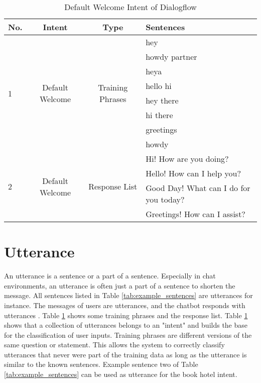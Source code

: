 \begin{table}[H]
    \centering
    \begin{tabular}{ l | c | c | l }
  No. & Intent & Type & Sentences \\ \hline \hline
  \multirow{8}{*}{1}
  & \multirow{8}{*}{Default Welcome} & \multirow{8}{*}{Training Phrases} & hey \\
      & & & howdy partner\\
      & & & heya\\ 
      & & & hello hi\\ 
      & & & hey there\\ 
      & & & hi there\\ 
      & & & greetings\\ 
      & & & howdy \\ \hline
  \multirow{4}{*}{2}
  & \multirow{4}{*}{Default Welcome} & \multirow{4}{*}{Response List} & Hi! How are you doing? \\
      & & & Hello! How can I help you?\\
      & & & Good Day! What can I do for you today?\\ 
      & & & Greetings! How can I assist?\\ \hline
\end{tabular}
    \caption{Default Welcome Intent of Dialogflow} \label{tab:defaultwelcomedialogflow}
\end{table} \noindent



\section{Utterance} \label{sec:utterance}
An utterance is a sentence or a part of a sentence.
Especially in chat environments, an utterance is often just a part of a sentence to shorten the message. 
All sentences listed in Table \ref{tab:example_sentences} are utterances for instance.
The messages of users are utterances, and the chatbot responds with utterances \cite{singhbuilding, dutta2017developing}.
Table \ref{tab:defaultwelcomedialogflow} shows some training phrases and the response list.
Table \ref{tab:defaultwelcomedialogflow} shows that a collection of utterances belongs to an "intent" and builds the base for the classification of user inputs.
Training phrases are different versions of the same question or statement.
This allows the system to correctly classify utterances that never were part of the training data as long as the utterance is similar to the known sentences.
Example sentence two of Table \ref{tab:example_sentences} can be used 
as utterance for the book hotel intent.

